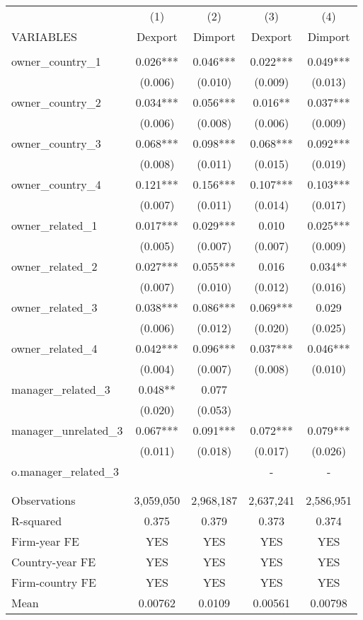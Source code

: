 \begin{tabular}{lcccc} \hline
 & (1) & (2) & (3) & (4) \\
VARIABLES & Dexport & Dimport & Dexport & Dimport \\ \hline
 &  &  &  &  \\
owner\_country\_1 & 0.026*** & 0.046*** & 0.022*** & 0.049*** \\
 & (0.006) & (0.010) & (0.009) & (0.013) \\
owner\_country\_2 & 0.034*** & 0.056*** & 0.016** & 0.037*** \\
 & (0.006) & (0.008) & (0.006) & (0.009) \\
owner\_country\_3 & 0.068*** & 0.098*** & 0.068*** & 0.092*** \\
 & (0.008) & (0.011) & (0.015) & (0.019) \\
owner\_country\_4 & 0.121*** & 0.156*** & 0.107*** & 0.103*** \\
 & (0.007) & (0.011) & (0.014) & (0.017) \\
owner\_related\_1 & 0.017*** & 0.029*** & 0.010 & 0.025*** \\
 & (0.005) & (0.007) & (0.007) & (0.009) \\
owner\_related\_2 & 0.027*** & 0.055*** & 0.016 & 0.034** \\
 & (0.007) & (0.010) & (0.012) & (0.016) \\
owner\_related\_3 & 0.038*** & 0.086*** & 0.069*** & 0.029 \\
 & (0.006) & (0.012) & (0.020) & (0.025) \\
owner\_related\_4 & 0.042*** & 0.096*** & 0.037*** & 0.046*** \\
 & (0.004) & (0.007) & (0.008) & (0.010) \\
manager\_related\_3 & 0.048** & 0.077 &  &  \\
 & (0.020) & (0.053) &  &  \\
manager\_unrelated\_3 & 0.067*** & 0.091*** & 0.072*** & 0.079*** \\
 & (0.011) & (0.018) & (0.017) & (0.026) \\
o.manager\_related\_3 &  &  & - & - \\
 &  &  &  &  \\
 &  &  &  &  \\
Observations & 3,059,050 & 2,968,187 & 2,637,241 & 2,586,951 \\
R-squared & 0.375 & 0.379 & 0.373 & 0.374 \\
Firm-year FE & YES & YES & YES & YES \\
Country-year FE & YES & YES & YES & YES \\
Firm-country FE & YES & YES & YES & YES \\
 Mean & 0.00762 & 0.0109 & 0.00561 & 0.00798 \\ \hline
\end{tabular}
